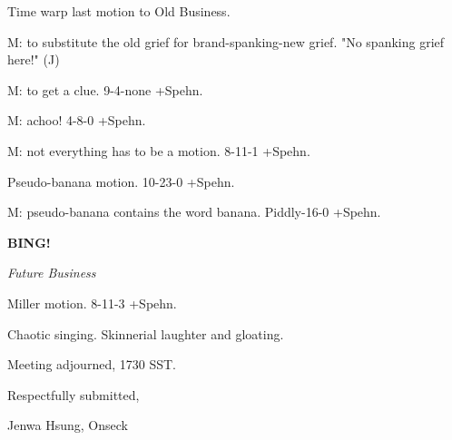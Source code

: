 \documentclass[12pt]{article}
\newcommand{\bing}{{\bf BING!} }
\newcommand{\goto}[1]{\bing \vskip 12pt \centerline{{\em{#1}}}}
\begin{document}
Time warp last motion to Old Business.

M: to substitute the old grief for brand-spanking-new grief. "No spanking grief here!" (J)

M: to get a clue. 9-4-none +Spehn.

M: achoo! 4-8-0 +Spehn.

M: not everything has to be a motion. 8-11-1 +Spehn.

Pseudo-banana motion. 10-23-0 +Spehn.

M: pseudo-banana contains the word banana. Piddly-16-0 +Spehn.

\goto{Future Business}

Miller motion. 8-11-3 +Spehn.

Chaotic singing. Skinnerial laughter and gloating.

\vspace{12pt}

\noindent
Meeting adjourned, 1730 SST.

\vspace{18pt}

\centerline{Respectfully submitted,}
\centerline{Jenwa Hsung, Onseck}
\end{document}
